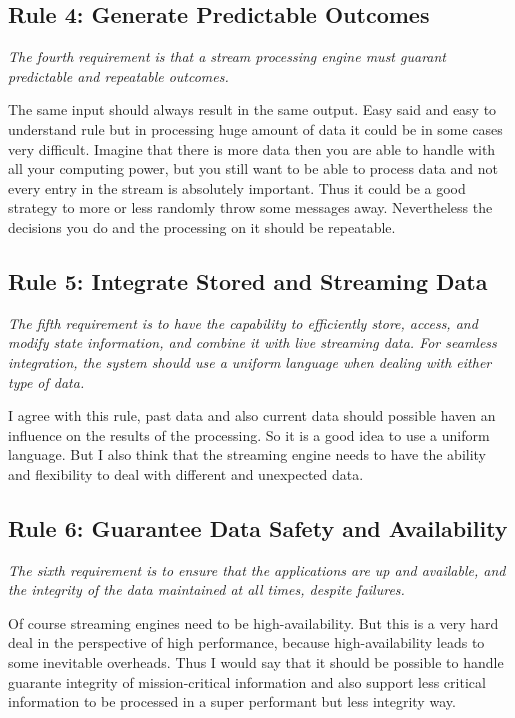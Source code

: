 \subsection{Rule 4: Generate Predictable Outcomes}
\textit{The fourth requirement is that a stream processing engine
        must guarant predictable and repeatable outcomes.}

\medskip
The same input should always result in the same output.
Easy said and easy to understand rule but in processing huge amount of data it could be in some cases very difficult.
Imagine that there is more data then you are able to handle with all your computing power,
but you still want to be able to process data and not every entry in the stream is absolutely important.
Thus it could be a good strategy to more or less randomly throw some messages away.
Nevertheless the decisions you do and the processing on it should be repeatable.

\subsection{Rule 5: Integrate Stored and Streaming Data}
\textit{The fifth requirement is to have the capability to efficiently
        store, access, and modify state information, and combine it
        with live streaming data. For seamless integration, the
        system should use a uniform language when dealing with
        either type of data.}

\medskip
I agree with this rule, past data and also current data should possible haven an influence
on the results of the processing. So it is a good idea to use a uniform language.
But I also think that the streaming engine needs to have the ability and flexibility to deal with different
and unexpected data.

\newpage
\subsection{Rule 6: Guarantee Data Safety and Availability}
\textit{The sixth requirement is to ensure that the applications are
        up and available, and the integrity of the data maintained at
        all times, despite failures.}

\medskip
Of course streaming engines need to be high-availability.
But this is a very hard deal in the perspective of high performance,
because high-availability leads to some inevitable overheads.
Thus I would say that it should be possible to handle guarante integrity of mission-critical information
and also support less critical information to be processed in a super performant but less integrity way.

